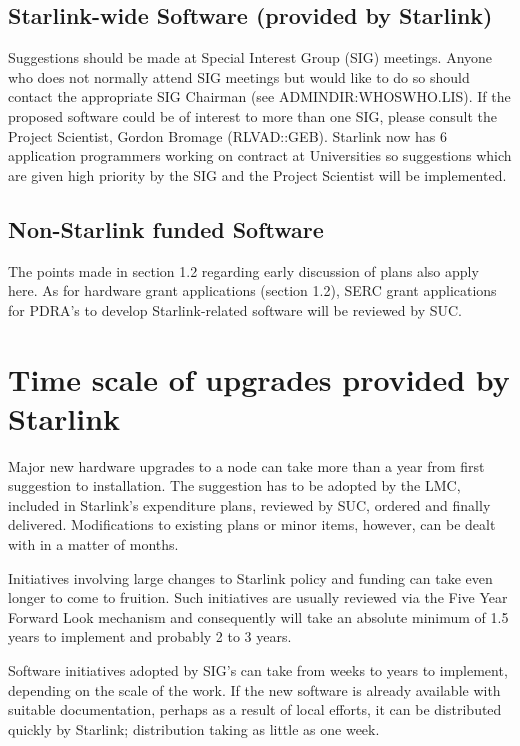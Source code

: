 \subsection{Starlink-wide Software (provided by Starlink)}
Suggestions should be made at Special Interest Group (SIG) meetings.
Anyone who does not normally attend SIG meetings but would like to do so should
contact the appropriate SIG Chairman (see ADMINDIR:WHOSWHO.LIS).
If the proposed software could be of interest to more than one SIG, please
consult the Project Scientist, Gordon Bromage (RLVAD::GEB).
Starlink now has 6 application programmers working on contract at Universities
so suggestions which are given high priority by the SIG and the Project
Scientist will be implemented.

\subsection{Non-Starlink funded Software}
The points made in section 1.2 regarding early discussion of plans also apply
here.
As for hardware grant applications (section 1.2), SERC grant applications
for PDRA's to develop Starlink-related software will be reviewed by SUC.

\section{Time scale of upgrades provided by Starlink}

Major new hardware upgrades to a node can take more than a year from first
suggestion to installation.
The suggestion has to be adopted by the LMC, included in Starlink's expenditure
plans, reviewed by SUC, ordered and finally delivered.
Modifications to existing plans or minor items, however, can be dealt with in
a matter of months.

Initiatives involving large changes to Starlink policy and funding can take even
longer to come to fruition.
Such initiatives are usually reviewed via the Five Year Forward Look mechanism
and consequently will take an absolute minimum of 1.5 years to implement and
probably 2 to 3 years.

Software initiatives adopted by SIG's can take from weeks to years to implement,
depending on the scale of the work.
If the new software is already available with suitable documentation, perhaps
as a result of local efforts, it can be distributed quickly by Starlink;
distribution taking as little as one week.

